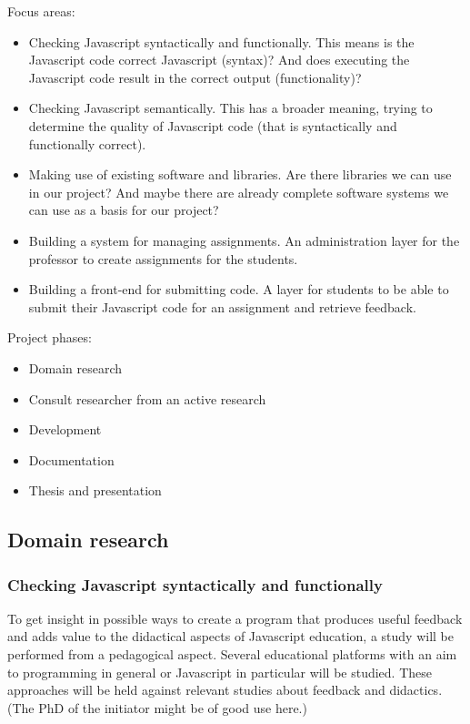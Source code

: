 \documentclass{article}
\begin{document}
Focus areas:
\begin{itemize}
  \item Checking Javascript syntactically and functionally. This means is the Javascript code correct Javascript (syntax)? And does executing the Javascript code result in the correct output (functionality)?
  \item Checking Javascript semantically. This has a broader meaning, trying to determine the quality of Javascript code (that is syntactically and functionally correct).
  \item Making use of existing software and libraries. Are there libraries we can use in our project? And maybe there are already complete software systems we can use as a basis for our project?
  \item Building a system for managing assignments. An administration layer for the professor to create assignments for the students.
  \item Building a front-end for submitting code. A layer for students to be able to submit their Javascript code for an assignment and retrieve feedback.
\end{itemize}

Project phases:
\begin{itemize}
  \item Domain research
  \item Consult researcher from an active research
  \item Development
  \item Documentation
  \item Thesis and presentation
\end{itemize}


\subsection{Domain research}

\subsubsection{Checking Javascript syntactically and functionally}
To get insight in possible ways to create a program that produces useful feedback and adds value to the didactical aspects of Javascript education, a study will be performed from a pedagogical aspect. Several educational platforms with an aim to programming in general or Javascript in particular will be studied. These approaches will be held against relevant studies about feedback and didactics. (The PhD of the initiator might be of good use here.)
\end{document}
